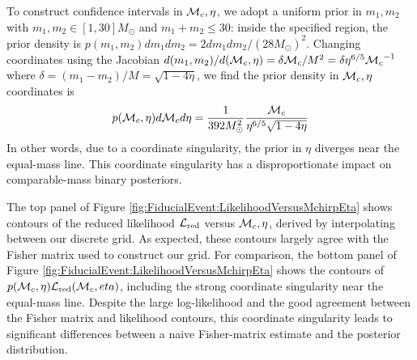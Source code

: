 To construct confidence intervals in ${{\cal M}_c},\eta$, we adopt a uniform prior in $m_1,m_2$ with $m_1,m_2\in[1,30]M_\odot$
and $m_1+m_2\le 30$: inside the specified region, the prior density is $p(m_1,m_2)dm_1dm_2=2 dm_1 dm_2/(28 M_\odot)^2$.
Changing coordinates using the Jacobian $d(m_1,m_2)/d({{\cal M}_c},\eta)= \delta {{\cal M}_c}/M^2 = \delta \eta^{6/5}{{\cal M}_c}^{-1}$ where
$\delta = (m_1-m_2)/M = \sqrt{1-4\eta}$, we find the prior density in ${{\cal M}_c},\eta$ coordinates is
\begin{eqnarray}
p({{\cal M}_c},\eta) d{{\cal M}_c} d\eta =  \frac{1}{392 M_\odot^2} \frac{{{\cal M}_c}}{\eta^{6/5}\sqrt{1-4\eta}}
\end{eqnarray}
%
In other words, due to a coordinate singularity, the prior in $\eta$ diverges near the equal-mass line.  
%
This coordinate singularity has a disproportionate impact on comparable-mass binary posteriors.


The top panel of Figure \ref{fig:FiducialEvent:LikelihoodVersusMchirpEta} shows contours of the reduced likelihood ${\cal L}_{\rm red}$ versus
${{\cal M}_c},\eta$, derived by interpolating between our discrete grid.   As expected, these contours largely agree with the
Fisher matrix used to construct our grid. 
%
For comparison, the bottom panel of Figure \ref{fig:FiducialEvent:LikelihoodVersusMchirpEta} shows the contours of
$p({{\cal M}_c},\eta){\cal L}_{\rm red}({{\cal M}_c},eta)$, including the strong coordinate singularity near the equal-mass line.  
%
Despite the large log-likelihood and the good agreement between the Fisher matrix and likelihood contours, this
coordinate singularity leads to significant differences between a naive 
Fisher-matrix estimate and the posterior distribution.



